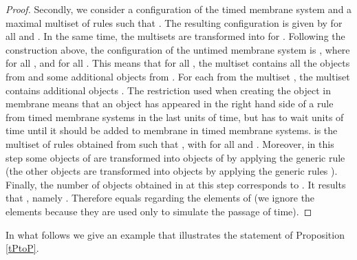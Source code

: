 \documentclass{eptcs}
\begin{document}
\begin{proof}
Secondly, we consider a configuration
 of the timed membrane system and a
maximal multiset  of rules such that
. The resulting
configuration   is
given by
 for all  and . In the same
time, the multisets  are transformed into
 for . Following the
construction above, the configuration of the untimed membrane system
is , where 
for all , and  for all . This means that
for all , the multiset  contains all the
objects from  and some additional objects from . For
each  from the multiset , the multiset 
contains additional objects . The restriction  used when creating the object  in membrane  means
that an object  has appeared in the right hand side of a rule
from timed membrane systems in the last  units of time,
but has to wait  units of time until it should be added to
membrane  in timed membrane systems.  is the multiset of
rules obtained from  such that
, with
 for all  and . Moreover, in this step some objects of  are
transformed into objects of  by applying the generic rule  (the other objects  are transformed into
objects  by applying the generic rules ). Finally, the number of objects 
obtained in  at this step corresponds to
. It results that
, namely
. Therefore  equals
 regarding the elements of  (we ignore the
elements  because they are used only to simulate the passage of time).
\end{proof}

In what follows we give an example that illustrates the statement of
Proposition \ref{tPtoP}.
\end{document}
